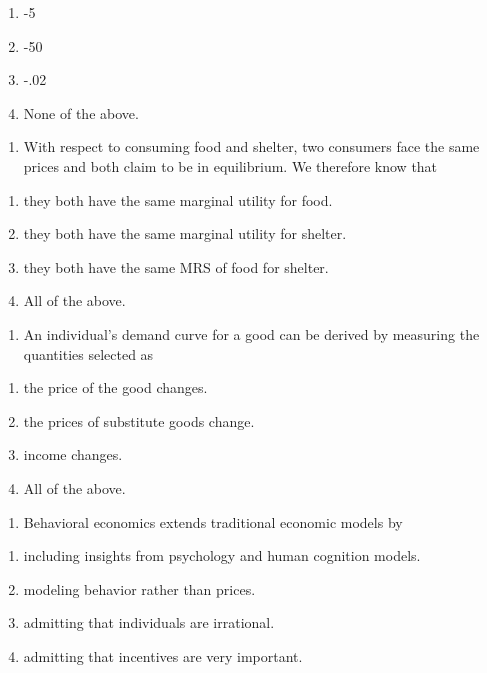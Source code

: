 \documentclass[11pt,]{article}
\providecommand{\tightlist}{%
  \setlength{\itemsep}{0pt}\setlength{\parskip}{0pt}}
\begin{document}
\begin{enumerate}
\def\labelenumi{\Alph{enumi})}
\tightlist
\item
  -5
\item
  -50
\item
  -.02
\item
  None of the above.
\end{enumerate}

\begin{enumerate}
\def\labelenumi{\arabic{enumi})}
\setcounter{enumi}{15}
\tightlist
\item
  With respect to consuming food and shelter, two consumers face the
  same prices and both claim to be in equilibrium. We therefore know
  that
\end{enumerate}

\begin{enumerate}
\def\labelenumi{\Alph{enumi})}
\tightlist
\item
  they both have the same marginal utility for food.
\item
  they both have the same marginal utility for shelter.
\item
  they both have the same MRS of food for shelter.
\item
  All of the above.
\end{enumerate}

\begin{enumerate}
\def\labelenumi{\arabic{enumi})}
\setcounter{enumi}{16}
\tightlist
\item
  An individual's demand curve for a good can be derived by measuring
  the quantities selected as
\end{enumerate}

\begin{enumerate}
\def\labelenumi{\Alph{enumi})}
\tightlist
\item
  the price of the good changes.
\item
  the prices of substitute goods change.
\item
  income changes.
\item
  All of the above.
\end{enumerate}

\begin{enumerate}
\def\labelenumi{\arabic{enumi})}
\setcounter{enumi}{17}
\tightlist
\item
  Behavioral economics extends traditional economic models by
\end{enumerate}

\begin{enumerate}
\def\labelenumi{\Alph{enumi})}
\tightlist
\item
  including insights from psychology and human cognition models.
\item
  modeling behavior rather than prices.
\item
  admitting that individuals are irrational.
\item
  admitting that incentives are very important.
\end{enumerate}
\end{document}
